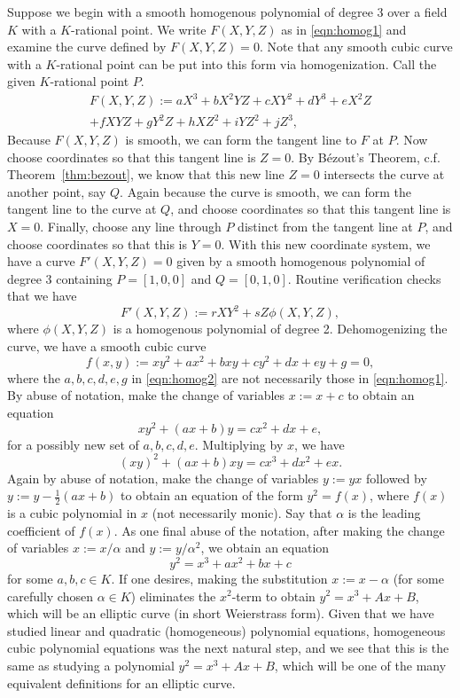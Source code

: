Suppose we begin with a smooth homogenous polynomial of degree 3 over a field $K$ with a $K$-rational point. We write $F(X,Y,Z)$ as in \eqref{eqn:homog1} and examine the curve defined by $F(X,Y,Z)= 0$. Note that any smooth cubic curve with a $K$-rational point can be put into this form via homogenization. Call the given $K$-rational point $P$. 
	\begin{equation} \label{eqn:homog1}
	\begin{aligned}
	F(X,Y,Z):= aX^3 + bX^2YZ + cXY^2 + dY^3 + eX^2Z  \\
	+fXYZ +gY^2Z + hXZ^2 + iYZ^2 + jZ^3,
	\end{aligned}
	\end{equation}
Because $F(X,Y,Z)$ is smooth, we can form the tangent line to $F$ at $P$. Now choose coordinates so that this tangent line is $Z= 0$. By B\'ezout's Theorem, c.f. Theorem~\ref{thm:bezout}, we know that this new line $Z= 0$ intersects the curve at another point, say $Q$. Again because the curve is smooth, we can form the tangent line to the curve at $Q$, and choose coordinates so that this tangent line is $X= 0$. Finally, choose any line through $P$ distinct from the tangent line at $P$, and choose coordinates so that this is $Y= 0$. With this new coordinate system, we have a curve $F'(X,Y,Z)= 0$ given by a smooth homogenous polynomial of degree 3 containing $P= [1,0,0]$ and $Q= [0,1,0]$. Routine verification checks that we have 
	\[
	F'(X,Y,Z):= rXY^2 + s Z \phi(X,Y,Z),
	\]
where $\phi(X,Y,Z)$ is a homogenous polynomial of degree 2. Dehomogenizing the curve, we have a smooth cubic curve
	\begin{equation} \label{eqn:homog2}
	f(x,y):= xy^2 + ax^2 + bxy + cy^2 + dx + ey + g= 0,
	\end{equation}
where the $a, b, c, d, e, g$ in \eqref{eqn:homog2} are not necessarily those in \eqref{eqn:homog1}. By abuse of notation, make the change of variables $x:= x + c$ to obtain an equation
	\[
	xy^2 + (ax + b)y= cx^2 + dx + e,
	\]
for a possibly new set of $a, b, c, d, e$. Multiplying by $x$, we have
	\[
	(xy)^2 + (ax + b)xy= cx^3 + dx^2 + ex.
	\]
Again by abuse of notation, make the change of variables $y:= yx$ followed by $y:= y - \frac{1}{2} (ax + b)$ to obtain an equation of the form $y^2= f(x)$, where $f(x)$ is a cubic polynomial in $x$ (not necessarily monic). Say that $\alpha$ is the leading coefficient of $f(x)$. As one final abuse of the notation, after making the change of variables $x:= x/\alpha$ and $y:= y/\alpha^2$, we obtain an equation
	\[
	y^2= x^3 + ax^2 + bx + c
	\]
for some $a, b, c \in K$. If one desires, making the substitution $x:= x - \alpha$ (for some carefully chosen $\alpha \in K$) eliminates the $x^2$-term to obtain $y^2= x^3 + Ax + B$, which will be an elliptic curve (in short Weierstrass form). Given that we have studied linear and quadratic (homogeneous) polynomial equations, homogeneous cubic polynomial equations was the next natural step, and we see that this is the same as studying a polynomial $y^2= x^3 + Ax + B$, which will be one of the many equivalent definitions for an elliptic curve. 


